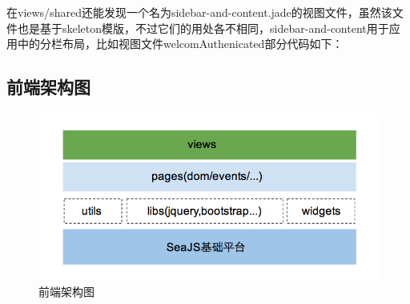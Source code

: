 \indent
在views/shared还能发现一个名为sidebar-and-content.jade的视图文件，虽然该文件也是基于skeleton模版，不过它们的用处各不相同，sidebar-and-content用于应用中的分栏布局，比如视图文件welcomAuthenicated部分代码如下：



\subsection{前端架构图}
\begin{figure}[h]
  \centering
    \includegraphics[width=1\textwidth]{./images/client-side-architecture.png}
  \caption{前端架构图}
\end{figure}


\clearpage